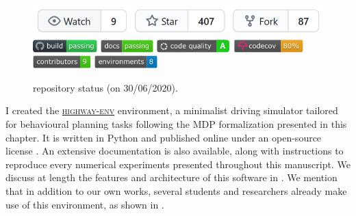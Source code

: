 \begin{figure}[ht]
	\centering
	\includegraphics[width=0.6\linewidth]{img/he-git}\\
	\includegraphics[height=0.5cm]{img/he-buil.pdf}
	\includegraphics[height=0.5cm]{img/he-docs.pdf}
	\includegraphics[height=0.5cm]{img/he-qual.pdf}
	\includegraphics[height=0.5cm]{img/he-cov.pdf}
	\includegraphics[height=0.5cm]{img/he-contr.pdf}
	\includegraphics[height=0.5cm]{img/he-envs.pdf}
	\caption{\highwayenv repository status (on 30/06/2020).}
	\label{fig:highway-env-status}
\end{figure}

I created the \href{https://github.com/eleurent/highway-env}{\textsc{highway-env}} environment, a minimalist driving simulator tailored for behavioural planning tasks following the \gls{MDP} formalization presented in this chapter. It is written in Python and published online under an open-source license \citep{highway-env}. An extensive documentation is also available, along with instructions to reproduce every numerical experiments presented throughout this manuscript. We discuss at length the features and architecture of this software in . We mention that in addition to our own works, several students and researchers already make use of this environment, as shown in .

